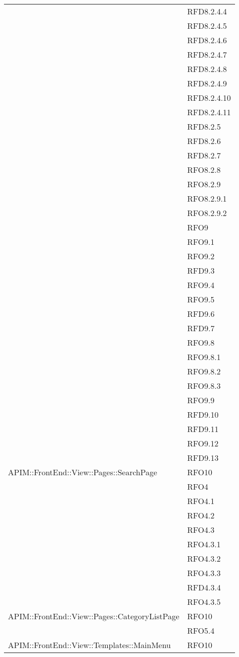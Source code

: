 \begin{longtable}{ p{12cm} | p{4cm} }
			&RFD8.2.4.4\\
			&RFD8.2.4.5\\
			&RFD8.2.4.6\\
			&RFD8.2.4.7\\
			&RFD8.2.4.8\\
			&RFD8.2.4.9\\
			&RFD8.2.4.10\\
			&RFD8.2.4.11\\
			&RFD8.2.5\\
			&RFD8.2.6\\
			&RFD8.2.7\\
			&RFO8.2.8\\
			&RFO8.2.9\\
			&RFO8.2.9.1\\
			&RFO8.2.9.2\\
			&RFO9\\
			&RFO9.1\\
			&RFO9.2\\
			&RFD9.3\\
			&RFO9.4\\
			&RFO9.5\\
			&RFD9.6\\
			&RFD9.7\\
			&RFO9.8\\
			&RFO9.8.1\\
			&RFO9.8.2\\
			&RFO9.8.3\\
			&RFO9.9\\
			&RFD9.10\\
			&RFD9.11\\
			&RFO9.12\\
			&RFD9.13\\
			\hline
		    APIM::FrontEnd::View::Pages::SearchPage& RFO10 \\
		    &RFO4\\
		    &RFO4.1\\
		    &RFO4.2\\
		    &RFO4.3\\
		    &RFO4.3.1\\
		    &RFO4.3.2\\
		    &RFO4.3.3\\
		    &RFD4.3.4\\
		    &RFO4.3.5\\
		    \hline
		    APIM::FrontEnd::View::Pages::CategoryListPage& RFO10 \\
		    &RFO5.4\\
		    
		    \hline
		    APIM::FrontEnd::View::Templates::MainMenu& RFO10 \\
		    

\end{longtable}
